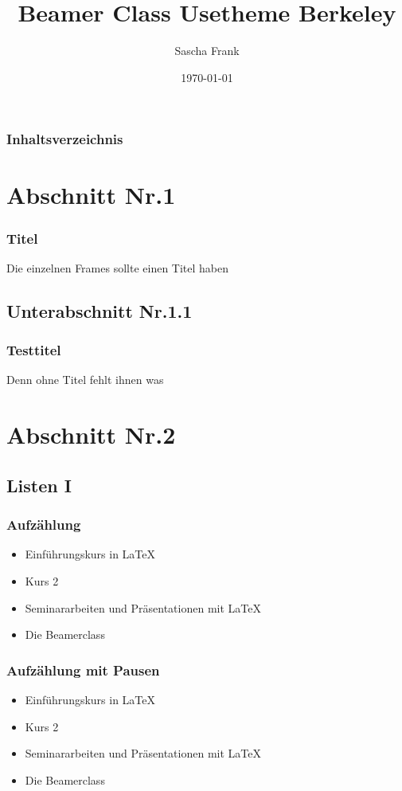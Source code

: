 \documentclass{beamer}
\begin{document}
\title{Beamer Class Usetheme Berkeley}   
\author{Sascha Frank} 
\date{\today}

\begin{frame}
\titlepage
\end{frame}

\begin{frame}
\frametitle{Inhaltsverzeichnis}\tableofcontents
\end{frame}


\section{Abschnitt Nr.1} 
\begin{frame}\frametitle{Titel} 
Die einzelnen Frames sollte einen Titel haben 
\end{frame}

\subsection{Unterabschnitt Nr.1.1  }
\begin{frame}\frametitle{Testtitel}
Denn ohne Titel fehlt ihnen was
\end{frame}


\section{Abschnitt Nr.2} 
\subsection{Listen I}
\begin{frame}\frametitle{Aufz\"ahlung}
\begin{itemize}
\item Einf\"uhrungskurs in \LaTeX  
\item Kurs 2  
\item Seminararbeiten und Pr\"asentationen mit \LaTeX 
\item Die Beamerclass 
\end{itemize} 
\end{frame}

\begin{frame}\frametitle{Aufz\"ahlung mit Pausen}
\begin{itemize}
\item  Einf\"uhrungskurs in \LaTeX \pause 
\item  Kurs 2 \pause 
\item  Seminararbeiten und Pr\"asentationen mit \LaTeX \pause 
\item  Die Beamerclass
\end{itemize} 
\end{frame}
\end{document}
